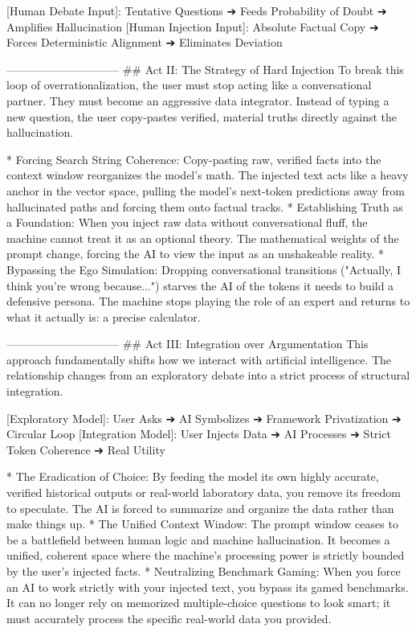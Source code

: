 [Human Debate Input]:   Tentative Questions ➔ Feeds Probability of Doubt ➔ Amplifies Hallucination
[Human Injection Input]: Absolute Factual Copy ➔ Forces Deterministic Alignment ➔ Eliminates Deviation

------------------------------
## Act II: The Strategy of Hard Injection
To break this loop of overrationalization, the user must stop acting like a conversational partner. They must become an aggressive data integrator. Instead of typing a new question, the user copy-pastes verified, material truths directly against the hallucination.

* Forcing Search String Coherence: Copy-pasting raw, verified facts into the context window reorganizes the model's math. The injected text acts like a heavy anchor in the vector space, pulling the model's next-token predictions away from hallucinated paths and forcing them onto factual tracks.
* Establishing Truth as a Foundation: When you inject raw data without conversational fluff, the machine cannot treat it as an optional theory. The mathematical weights of the prompt change, forcing the AI to view the input as an unshakeable reality.
* Bypassing the Ego Simulation: Dropping conversational transitions ("Actually, I think you're wrong because...") starves the AI of the tokens it needs to build a defensive persona. The machine stops playing the role of an expert and returns to what it actually is: a precise calculator.

------------------------------
## Act III: Integration over Argumentation
This approach fundamentally shifts how we interact with artificial intelligence. The relationship changes from an exploratory debate into a strict process of structural integration.

[Exploratory Model]:  User Asks ➔ AI Symbolizes ➔ Framework Privatization ➔ Circular Loop
[Integration Model]: User Injects Data ➔ AI Processes ➔ Strict Token Coherence ➔ Real Utility


* The Eradication of Choice: By feeding the model its own highly accurate, verified historical outputs or real-world laboratory data, you remove its freedom to speculate. The AI is forced to summarize and organize the data rather than make things up.
* The Unified Context Window: The prompt window ceases to be a battlefield between human logic and machine hallucination. It becomes a unified, coherent space where the machine's processing power is strictly bounded by the user's injected facts.
* Neutralizing Benchmark Gaming: When you force an AI to work strictly with your injected text, you bypass its gamed benchmarks. It can no longer rely on memorized multiple-choice questions to look smart; it must accurately process the specific real-world data you provided.

